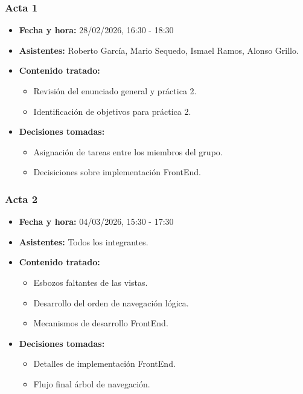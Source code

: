 \documentclass[12pt,a4paper]{article}
\begin{document}
\subsubsection{Acta 1}
\begin{itemize}
    \item \textbf{Fecha y hora: } 28/02/2026, 16:30 - 18:30
    \item \textbf{Asistentes: } Roberto García, Mario Sequedo, Ismael Ramos, Alonso Grillo.
    \item \textbf{Contenido tratado: } 
    \begin{itemize}
        \item Revisión del enunciado general y práctica 2.
        \item Identificación de objetivos para práctica 2.
    \end{itemize}
    \item \textbf{Decisiones tomadas: }
    \begin{itemize}
        \item Asignación de tareas entre los miembros del grupo.
        \item Decisiciones sobre implementación FrontEnd.
    \end{itemize}
\end{itemize}

\subsubsection{Acta 2}
\begin{itemize}
    \item \textbf{Fecha y hora: } 04/03/2026, 15:30 - 17:30
    \item \textbf{Asistentes: } Todos los integrantes.
    \item \textbf{Contenido tratado: }
    \begin{itemize}
        \item Esbozos faltantes de las vistas.
        \item Desarrollo del orden de navegación lógica.
        \item Mecanismos de desarrollo FrontEnd.
    \end{itemize}
    \item \textbf{Decisiones tomadas: }
    \begin{itemize}
        \item Detalles de implementación FrontEnd.
        \item Flujo final árbol de navegación.
    \end{itemize}
\end{itemize}
\end{document}
